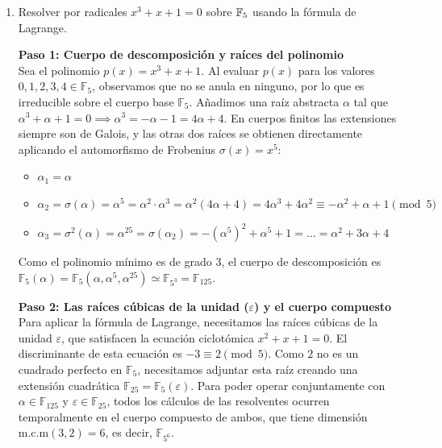 \begin{enumerate}
\begin{dem}
$$ G \simeq \mathbb{Z}_2 \times \mathbb{Z}_2 $$
    \end{dem} 
    \item Resolver por radicales $x^3 + x + 1 = 0$ sobre $\mathbb{F}_5$ usando la f\'ormula de Lagrange.
    \begin{dem}\textbf{Paso 1: Cuerpo de descomposición y raíces del polinomio} \\
Sea el polinomio $p(x) = x^3 + x + 1$. Al evaluar $p(x)$ para los valores $0, 1, 2, 3, 4 \in \mathbb{F}_5$, observamos que no se anula en ninguno, por lo que es irreducible sobre el cuerpo base $\mathbb{F}_5$.
Añadimos una raíz abstracta $\alpha$ tal que $\alpha^3 + \alpha + 1 = 0 \implies \alpha^3 = -\alpha - 1 = 4\alpha + 4$.
En cuerpos finitos las extensiones siempre son de Galois, y las otras dos raíces se obtienen directamente aplicando el automorfismo de Frobenius $\sigma(x) = x^5$:
\begin{itemize}
    \item $\alpha_1 = \alpha$
    \item $\alpha_2 = \sigma(\alpha) = \alpha^5 = \alpha^2 \cdot \alpha^3 = \alpha^2(4\alpha + 4) = 4\alpha^3 + 4\alpha^2 \equiv -\alpha^2 + \alpha + 1 \pmod 5$
    \item $\alpha_3 = \sigma^2(\alpha) = \alpha^{25} = \sigma(\alpha_2) = -(\alpha^5)^2 + \alpha^5 + 1 = \dots = \alpha^2 + 3\alpha + 4$
\end{itemize}
Como el polinomio mínimo es de grado 3, el cuerpo de descomposición es $\mathbb{F}_5(\alpha) = \mathbb{F}_5(\alpha, \alpha^{5}, \alpha^{25}) \simeq \mathbb{F}_{5^3} = \mathbb{F}_{125}$.

\textbf{Paso 2: Las raíces cúbicas de la unidad ($\varepsilon$) y el cuerpo compuesto} \\
Para aplicar la fórmula de Lagrange, necesitamos las raíces cúbicas de la unidad $\varepsilon$, que satisfacen la ecuación ciclotómica $x^2 + x + 1 = 0$. 
El discriminante de esta ecuación es $-3 \equiv 2 \pmod 5$. Como $2$ no es un cuadrado perfecto en $\mathbb{F}_5$, necesitamos adjuntar esta raíz creando una extensión cuadrática $\mathbb{F}_{25} = \mathbb{F}_5(\varepsilon)$.
Para poder operar conjuntamente con $\alpha \in \mathbb{F}_{125}$ y $\varepsilon \in \mathbb{F}_{25}$, todos los cálculos de las resolventes ocurren temporalmente en el cuerpo compuesto de ambos, que tiene dimensión $\text{m.c.m}(3, 2) = 6$, es decir, $\mathbb{F}_{5^6}$.


\end{dem}
\end{enumerate}
